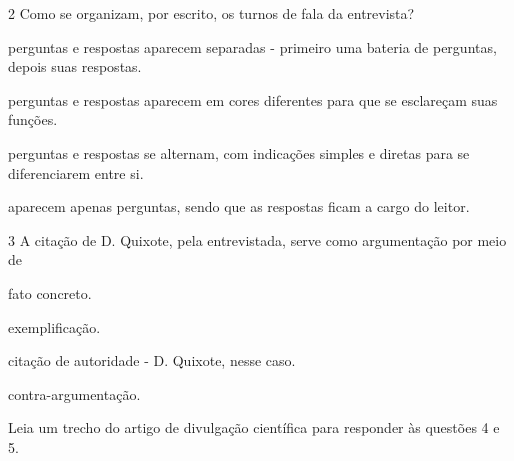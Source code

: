 \num{2} Como se organizam, por escrito, os turnos de fala da entrevista?

\begin{escolha}
\item perguntas e respostas aparecem separadas - primeiro uma bateria de
perguntas, depois suas respostas.

\item perguntas e respostas aparecem em cores diferentes para que se
esclareçam suas funções.

\item perguntas e respostas se alternam, com indicações simples e diretas
para se diferenciarem entre si.

\item aparecem apenas perguntas, sendo que as respostas ficam a cargo do
leitor.
\end{escolha}

\pagebreak
\num{3} A citação de D. Quixote, pela entrevistada, serve como
argumentação por meio de


\begin{escolha}
\item fato concreto.

\item exemplificação.

\item citação de autoridade - D. Quixote, nesse caso.

\item contra-argumentação.

\end{escolha}

Leia um trecho do artigo de divulgação científica para responder às
questões 4 e 5.

